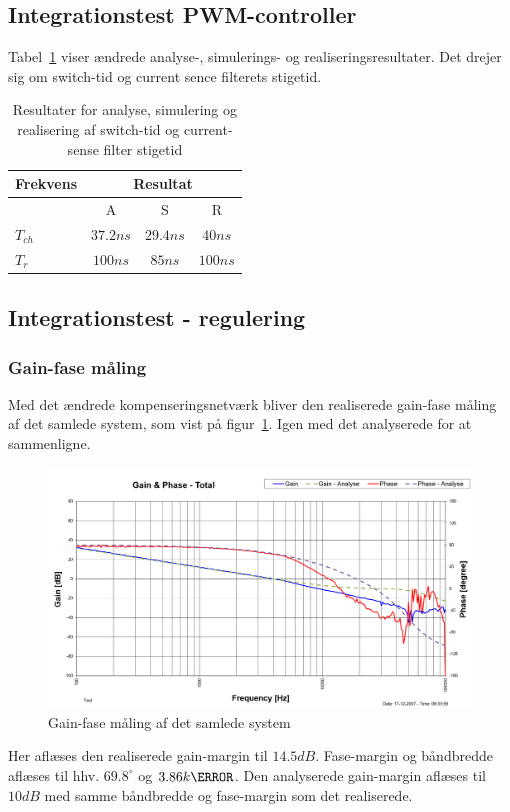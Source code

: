 \subsection{Integrationstest PWM-controller}
Tabel~\ref{tab:resultat_klkl} viser ændrede analyse-, simulerings- og realiseringsresultater. Det drejer sig om switch-tid og current sence filterets stigetid.
\begin{table}[H] 			
	\centering
	\begin{tabularx}{\textwidth}{|X|c|c|c|}
		\hline
		\textbf{Frekvens} & \multicolumn{3}{|c|}{\textbf{Resultat}} 		\\ \hline
		& A & S & R 									\\ \hline 
		$T_{ch}$ & $37.2ns$ & $29.4ns$ & $40ns$ 									\\ \hline
		$T_r$ & $100ns$ & $85ns$ & $100ns$					\\  \hline
	\end{tabularx}
	\caption{Resultater for analyse, simulering og realisering af switch-tid og current-sense filter stigetid}
	\label{tab:resultat_klkl}
\end{table}

\subsection{Integrationstest - regulering}

\subsubsection{Gain-fase måling}
Med det ændrede kompenseringsnetværk bliver den realiserede gain-fase måling af det samlede system, som vist på figur~\ref{fig:Realisering_total_3}. Igen med det analyserede for at sammenligne.
\begin{figure}[H]
	\center
	\includegraphics[max width=0.7\linewidth]{../dokumentation/tex/3iteration/billeder/Realisering/Realisering_gain_fase_total.PNG}
	\caption{Gain-fase måling af det samlede system}
	\label{fig:Realisering_total_3}
\end{figure}
Her aflæses den realiserede gain-margin til $14.5dB$. Fase-margin og båndbredde aflæses til hhv. $69.8^\circ$ og $3.86k\hertz$. Den analyserede gain-margin aflæses til $10dB$ med samme båndbredde og fase-margin som det realiserede.

